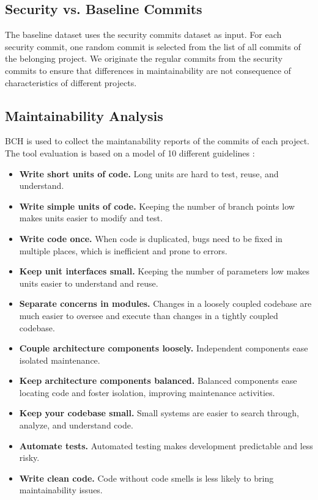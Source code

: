 \documentclass[10pt,conference]{IEEEtran}
\begin{document}
\subsection{Security vs. Baseline Commits}

The baseline dataset uses the security commits dataset as input. For each security commit, one random commit is selected from the list of all commits of the belonging project. We originate the regular commits from the security commits to ensure that differences in maintainability are not consequence of characteristics 
of different projects.


\subsection{Maintainability Analysis}

BCH is used to collect the maintanability reports of the commits of each project. The tool 
evaluation is based on a model of 10 different guidelines \cite{Visser:2016:OREILLY}:

\begin{itemize}
	\item \textbf{Write short units of code.} Long units are hard to test, reuse, and understand.
	\item \textbf{Write simple units of code.} Keeping the number of branch points low makes units easier to modify and test.
	\item \textbf{Write code once.} When code is duplicated, bugs need to be fixed in multiple places, which is inefficient and
prone to errors.
	\item \textbf{Keep unit interfaces small.} Keeping the number of parameters low makes units easier to understand and reuse.
	\item \textbf{Separate concerns in modules.} Changes in a loosely
coupled codebase are much easier to oversee and execute
than changes in a tightly coupled codebase.
	\item \textbf{Couple architecture components loosely.} Independent
components ease isolated maintenance.
	\item \textbf{Keep architecture components balanced.} Balanced
components ease locating code and foster isolation,
improving maintenance activities.
	\item \textbf{Keep your codebase small.} Small systems are easier to
search through, analyze, and understand code.
	\item \textbf{Automate tests.} Automated testing makes development
predictable and less risky.
	\item \textbf{Write clean code.} Code without code smells is less likely to bring maintainability issues.
\end{itemize}
\end{document}

